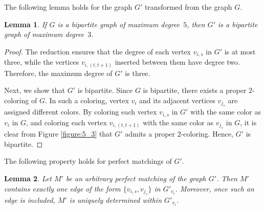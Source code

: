 \documentclass[a4paper,10pt]{article}
\newtheorem{lemma}{Lemma}
\begin{document}
The following lemma holds for the graph $G'$ transformed from the graph $G$.

\begin{lemma} \label{lem:5to3_bipartite}
    If $G$ is a bipartite graph of maximum degree~$5$, then $G'$ is a bipartite graph of maximum degree~$3$.
\end{lemma}

\begin{proof}
    The reduction ensures that the degree of each vertex $v_{i,s}$ in $G'$ is at most three, while the vertices $v_{i,(t,t+1)}$ inserted between them have degree two.
    Therefore, the maximum degree of $G'$ is three.

    Next, we show that $G'$ is bipartite.
    Since $G$ is bipartite, there exists a proper $2$-coloring of $G$.
    In such a coloring, vertex $v_i$ and its adjacent vertices $v_{j_s}$ are assigned different colors.
    By coloring each vertex $v_{i,s}$ in $G'$ with the same color as $v_i$ in $G$, and coloring each vertex $v_{i,(t,t+1)}$ with the same color as $v_{j_s}$ in $G$, it is clear from Figure \ref{figure:5_3} that $G'$ admits a proper $2$-coloring.
    Hence, $G'$ is bipartite.
\end{proof}

The following property holds for perfect matchings of $G'$.

\begin{lemma}\label{lem:prop_M_2}
    Let $M'$ be an arbitrary perfect matching of the graph $G'$.
    Then $M'$ contains exactly one edge of the form $\{v_{i,s}, v_{j_s}\}$ in $G'_{v_i}$.
    Moreover, once such an edge is included, $M'$ is uniquely determined within $G'_{v_i}$.
\end{lemma}
    
\end{document}

